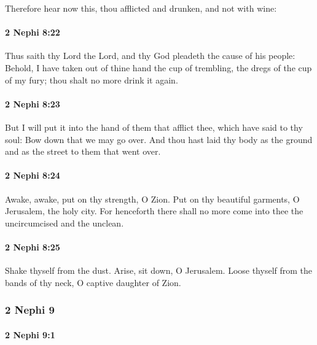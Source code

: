 			Therefore hear now this,
			thou afflicted and drunken, and not with wine:

		\paragraph{2 Nephi 8:22} %
			\label{2NEPHI-8-22}

			Thus saith thy Lord the Lord,
			and thy God pleadeth the cause of his people:
			Behold, I have taken out of thine hand the cup of trembling,
			the dregs of the cup of my fury;
			thou shalt no more drink it again.

		\paragraph{2 Nephi 8:23} %
			\label{2NEPHI-8-23}

			But I will put it into the hand of them that afflict thee,
			which have said to thy soul:
			Bow down that we may go over.
			And thou hast laid thy body as the ground and as the street
			to them that went over.

		\paragraph{2 Nephi 8:24} %
			\label{2NEPHI-8-24}

			Awake, awake, put on thy strength, O Zion.
			Put on thy beautiful garments, O Jerusalem, the holy city.
			For henceforth there shall no more come into thee
			the uncircumcised and the unclean.

		\paragraph{2 Nephi 8:25} %
			\label{2NEPHI-8-25}

			Shake thyself from the dust.
			Arise, sit down, O Jerusalem.
			Loose thyself from the bands of thy neck,
			O captive daughter of Zion.

	\subsubsection{2 Nephi 9} %
		\label{2NEPHI-9}
		
		\paragraph{2 Nephi 9:1} %
			\label{2NEPHI-9-1}

